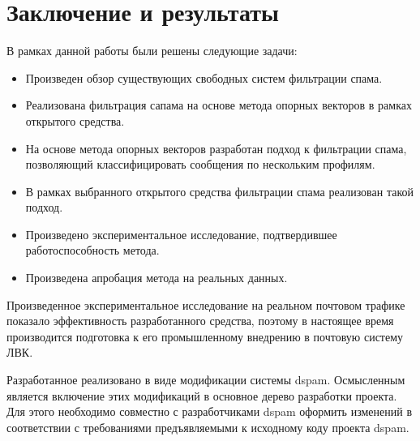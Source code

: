 \newpage
\section{Заключение и результаты}


В рамках данной	работы были решены следующие задачи:
\begin{itemize}
\item Произведен обзор существующих свободных систем фильтрации спама.
\item Реализована фильтрация сапама на основе метода опорных векторов в рамках открытого средства.
\item На основе метода опорных векторов разработан подход к фильтрации спама, позволяющий классифицировать сообщения по нескольким профилям.
\item В рамках выбранного открытого средства фильтрации спама реализован такой подход.
\item Произведено экспериментальное исследование, подтвердившее работоспособность метода.
\item Произведена апробация метода на реальных данных.
\end{itemize}


Произведенное экспериментальное исследование на реальном почтовом трафике показало эффективность разработанного средства, поэтому в настоящее время производится подготовка к его промышленному внедрению в почтовую систему ЛВК.

Разработанное реализовано в виде модификации системы dspam. Осмысленным является включение этих модификаций в основное дерево разработки проекта. Для этого необходимо совместно с разработчиками dspam оформить изменений в соответствии с требованиями предъявляемыми к исходному коду проекта dspam. 
